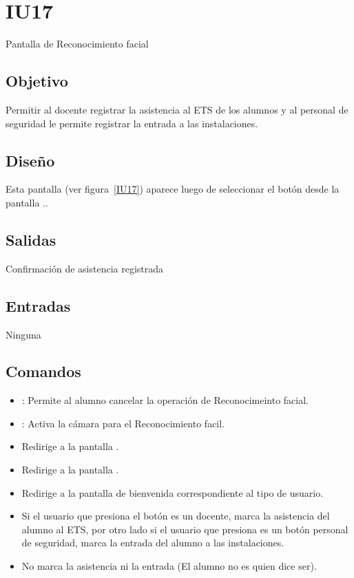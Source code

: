 \section{IU17} {Pantalla de Reconocimiento facial}

\subsection{Objetivo}
Permitir al docente registrar la asistencia al ETS de los alumnos y al personal de seguridad le permite registrar la entrada a las instalaciones.

\subsection{Diseño}
Esta pantalla  (ver figura~\ref{IU17}) aparece luego de seleccionar el botón  desde la pantalla ..



\subsection{Salidas}
Confirmación de asistencia registrada

\subsection{Entradas}
Ninguna

\subsection{Comandos}
\begin{itemize}
    \item {}: Permite al alumno cancelar la operación de Reconocimeinto facial.
    \item {}: Activa la cámara para el Reconocimiento facil. 
    \item {} Redirige a la pantalla .
    \item {} Redirige a la pantalla .
    \item {} Redirige a la pantalla de bienvenida correspondiente al tipo de usuario.
    \item {} Si el usuario que presiona el botón es un docente, marca la asistencia del alumno al ETS, por otro lado si el usuario que presiona es un botón personal de seguridad, marca la entrada del alumno a las instalaciones.
    \item {} No marca la asistencia ni la entrada (El alumno no es quien dice ser).
\end{itemize}


